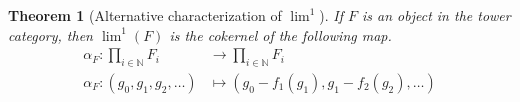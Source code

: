 \documentclass[12pt, notitlepage]{article}
\newtheorem{thm}{Theorem}[section]
\newtheorem{lem}[thm]{Lemma}
\theoremstyle{definition}
\begin{document}



\begin{thm}[Alternative characterization of $\lim^1$]\label{thm-lim1} 
  If $F$ is an object in the tower category, then $\lim^1(F)$ is the cokernel of the following map.
  \begin{align*}
    \alpha_F : \prod_{i \in \mathbb{N}} F_i &\to \prod_{i \in \mathbb{N}} F_i \\
    \alpha_F : (g_0, g_1, g_2, \ldots) &\mapsto \left(g_0 - f_1(g_1), g_1 - f_2(g_2), \ldots \right)
  \end{align*}
\end{thm}
\end{document}
